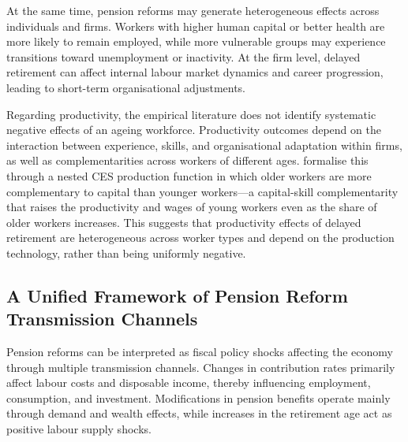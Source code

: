 \documentclass[11pt,english,a4paper, twoside, authoryear]{article}
\begin{document}
At the same time, pension reforms may generate heterogeneous effects across individuals and firms. Workers with higher human capital or better health are more likely to remain employed, while more vulnerable groups may experience transitions toward unemployment or inactivity. At the firm level, delayed retirement can affect internal labour market dynamics and career progression, leading to short-term organisational adjustments.

Regarding productivity, the empirical literature does not identify systematic negative effects of an ageing workforce. Productivity outcomes depend on the interaction between experience, skills, and organisational adaptation within firms, as well as complementarities across workers of different ages. \citet{Dai2022} formalise this through a nested CES production function in which older workers are more complementary to capital than younger workers---a capital-skill complementarity that raises the productivity and wages of young workers even as the share of older workers increases. This suggests that productivity effects of delayed retirement are heterogeneous across worker types and depend on the production technology, rather than being uniformly negative.


\subsection{A Unified Framework of Pension Reform Transmission Channels}

Pension reforms can be interpreted as fiscal policy shocks affecting the economy through multiple transmission channels. Changes in contribution rates primarily affect labour costs and disposable income, thereby influencing employment, consumption, and investment. Modifications in pension benefits operate mainly through demand and wealth effects, while increases in the retirement age act as positive labour supply shocks.
\end{document}
